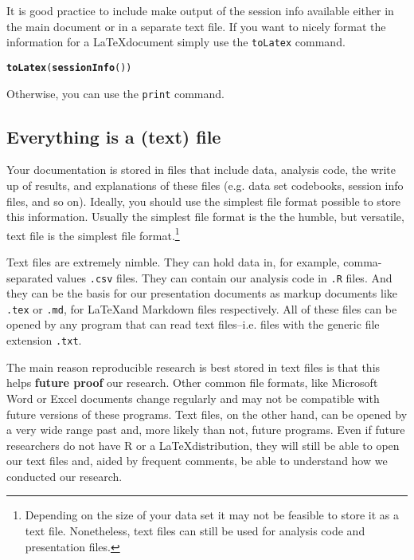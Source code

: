\documentclass[ChapterTOCs,krantz1]{krantz}\usepackage{graphicx, color}
\makeatletter
\newcommand{\hlfunctioncall}[1]{\textcolor[rgb]{0.501960784313725,0,0.329411764705882}{\textbf{#1}}}%
\newenvironment{kframe}{%
 \def\at@end@of@kframe{}%
 \ifinner\ifhmode%
  \def\at@end@of@kframe{\end{minipage}}%
  \begin{minipage}{\columnwidth}%
 \fi\fi%
 \def\FrameCommand##1{\hskip\@totalleftmargin \hskip-\fboxsep
 \colorbox{shadecolor}{##1}\hskip-\fboxsep
     \hskip-\linewidth \hskip-\@totalleftmargin \hskip\columnwidth}%
 \MakeFramed {\advance\hsize-\width
   \@totalleftmargin\z@ \linewidth\hsize
   \@setminipage}}%
 {\par\unskip\endMakeFramed%
 \at@end@of@kframe}
\newenvironment{knitrout}{}{} %
\makeatother
\begin{document}
\noindent It is good practice to include make output of the session info available either in the main document or in a separate text file. If you want to nicely format the information for a \LaTeX document simply use the {\tt{toLatex}} command.

\begin{knitrout}
\color{fgcolor}\begin{kframe}
\begin{alltt}
\hlfunctioncall{toLatex}(\hlfunctioncall{sessionInfo}())
\end{alltt}
\end{kframe}
\end{knitrout}


\noindent Otherwise, you can use the {\tt{print}} command. 

\subsection{Everything is a (text) file}

Your documentation is stored in files that include data, analysis code, the write up of results, and explanations of these files (e.g. data set codebooks, session info files, and so on). Ideally, you should use the simplest file format possible to store this information. Usually the simplest file format is the the humble, but versatile, text file is the simplest file format.\footnote{Depending on the size of your data set it may not be feasible to store it as a text file. Nonetheless, text files can still be used for analysis code and presentation files.} 

Text files are extremely nimble. They can hold data in, for example, comma-separated values {\tt{.csv}}  files. They can contain our analysis code in {\tt{.R}} files. And they can be the basis for our presentation documents as markup documents like {\tt{.tex}} or {\tt{.md}}, for \LaTeX and Markdown files respectively. All of these files can be opened by any program that can read text files--i.e. files with the generic file extension {\tt{.txt}}. 

The main reason reproducible research is best stored in text files is that this helps {\bf{future proof}} our research. Other common file formats, like Microsoft Word  or Excel  documents change regularly and may not be compatible with future versions of these programs. Text files, on the other hand, can be opened by a very wide range past and, more likely than not, future programs. Even if future researchers do not have R or a \LaTeX distribution, they will still be able to open our text files and, aided by frequent comments, be able to understand how we conducted our research.
\end{document}
